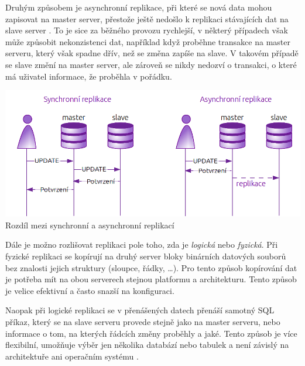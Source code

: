   Druhým způsobem je asynchronní replikace, při které se nová data mohou
  zapisovat na master server, přestože ještě nedošlo k replikaci stávajících dat
  na slave server \cite{ObeHsu2012}. To je sice za běžného provozu rychlejší, v
  některý případech však může způsobit nekonzistenci dat, například když proběhne
  transakce na master serveru, který však spadne dřív, než se změna zapíše na
  slave. V takovém případě se slave změní na master server, ale zároveň se nikdy
  nedozví o transakci, o které má uživatel informace, že proběhla v pořádku. 

  \begin{center}
    \includegraphics[width=\textwidth]{obr/schema_asyncSync.png}
     Rozdíl mezi synchronní a asynchronní replikací
  \end{center}

  Dále je možno rozlišovat replikaci pole toho, zda je {\it logická} nebo {\it
  fyzická}. Při fyzické replikaci se kopírují na druhý server bloky binárních
  datových souborů bez znalosti jejich struktury (sloupce, řádky, …). Pro tento
  způsob kopírování dat je potřeba mít na obou serverech stejnou platformu a
  architekturu. Tento způsob je velice efektivní a často snazší na konfiguraci. 

  Naopak při logické replikaci se v přenášených datech přenáší samotný SQL
  příkaz, který se na slave serveru provede stejně jako na master serveru, nebo
  informace o tom, na kterých řádcích změny proběhly a jaké. Tento způsob je více
  flexibilní, umožňuje výběr jen několika databází nebo tabulek a není závislý na
  architektuře ani operačním systému \cite{Boszormenyi2013}. 

